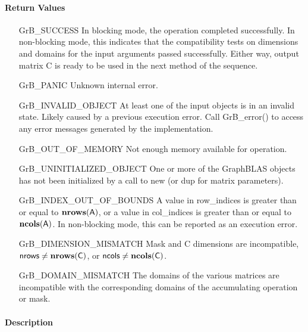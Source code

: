 \paragraph{Return Values}

\begin{itemize}[leftmargin=2.1in]
    \item[{\sf GrB\_SUCCESS}]         In blocking mode, the operation completed
    successfully. In non-blocking mode, this indicates that the compatibility 
    tests on dimensions and domains for the input arguments passed successfully. 
    Either way, output matrix {\sf C} is ready to be used in the next method of 
    the sequence.

    \item[{\sf GrB\_PANIC}]            Unknown internal error.
    
    \item[{\sf GrB\_INVALID\_OBJECT}] At least one of the input objects is in an invalid state.
	    Likely caused by a previous execution error.
    Call {GrB\_error()} to access 
    any error messages generated by the implementation.

    \item[{\sf GrB\_OUT\_OF\_MEMORY}]  Not enough memory available for operation.
    
    \item[{\sf GrB\_UNINITIALIZED\_OBJECT}] One or more of the GraphBLAS objects 
    has not been initialized by a call to {\sf new} (or {\sf dup} for matrix
    parameters).

    \item[{\sf GrB\_INDEX\_OUT\_OF\_BOUNDS}]  A value in {\sf row\_indices} 
    is greater than or equal to $\bold{nrows}({\sf A})$, or a value in 
    {\sf col\_indices} is greater than or equal to $\bold{ncols}({\sf A})$.  In 
    non-blocking mode, this can be reported as an execution error.
    
    \item[{\sf GrB\_DIMENSION\_MISMATCH}] {\sf Mask} and {\sf C} dimensions are
    incompatible, ${\sf nrows} \neq \bold{nrows}({\sf C})$, or 
    ${\sf ncols} \neq \bold{ncols}({\sf C})$.

    \item[{\sf GrB\_DOMAIN\_MISMATCH}]     The domains of the various matrices
    are incompatible with the corresponding domains of the accumulating 
    operation or mask.
\end{itemize}

\paragraph{Description}

